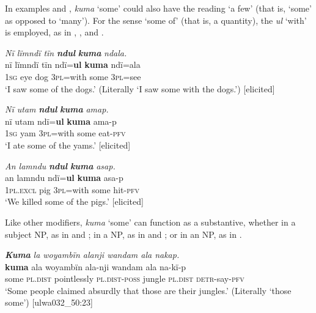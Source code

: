 In examples  and , \textit{kuma} ‘some’ could also have the reading ‘a few’ (that is, ‘some’ as opposed to ‘many’). For the sense ‘some of’ (that is, a  quantity), the  \textit{ul} ‘with’ is employed, as in , , and .

\ea%
    \label{ex:det:190}
          \textit{Nï lïmndï tïn} \textbf{\textit{ndul}} \textbf{\textit{kuma}} \textit{ndala.}\\
\gll    nï    lïmndï  tïn    ndï=\textbf{ul}    \textbf{kuma}  ndï=ala\\
    \textsc{1sg}  eye    dog  \textsc{3pl=}with  some  \textsc{3pl}=see\\
\glt `I saw some of the dogs.’ (Literally ‘I saw some with the dogs.’) [elicited]
\z

\ea%
    \label{ex:det:191}
          \textit{Nï utam} \textbf{\textit{ndul}} \textbf{\textit{kuma}} \textit{amap.}\\
\gll    nï    utam  ndï=\textbf{ul}    \textbf{kuma}  ama-p\\
    \textsc{1sg}  yam  \textsc{3pl=}with  some  eat-\textsc{pfv}\\
\glt `I ate some of the yams.’ [elicited]
\z

\ea%
    \label{ex:det:192}
          \textit{An lamndu} \textbf{\textit{ndul}} \textbf{\textit{kuma}} \textit{asap.}\\
\gll    an      lamndu  ndï=\textbf{ul}    \textbf{kuma}  asa-p\\
    1\textsc{pl.excl}  pig      \textsc{3pl=}with  some  hit-\textsc{pfv}\\
\glt `We killed some of the pigs.’ [elicited]
\z

Like other modifiers, \textit{kuma} ‘some’ can function as a substantive, whether in a subject NP, as in  and ; in a  NP, as in  and ; or in an  NP, as in .

\ea%
    \label{ex:det:193}
          \textbf{\textit{Kuma}} \textit{la woyambïn alanji wandam ala nakap.}\\
\gll    \textbf{kuma}  ala      woyambïn  ala-nji      wandam  ala na-kï-p\\
    some   \textsc{pl.dist}  pointlessly  \textsc{pl.dist{}-poss} jungle     \textsc{pl.dist}      \textsc{detr-}say-\textsc{pfv}\\
\glt `Some people claimed absurdly that those are their jungles.’ (Literally ‘those some’) [ulwa032\_50:23]
\z

